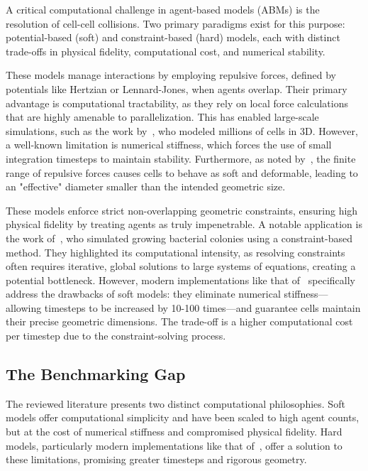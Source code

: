 \documentclass[conference]{IEEEtran}
\begin{document}
A critical computational challenge in agent-based models (ABMs) is the resolution of cell-cell collisions. Two primary paradigms exist for this purpose: potential-based (soft) and constraint-based (hard) models, each with distinct trade-offs in physical fidelity, computational cost, and numerical stability.

\begin{description}[style=nextline]
    \item[Potential-Based (Soft) Collision Models]
        These models manage interactions by employing repulsive forces, defined by potentials like Hertzian or Lennard-Jones, when agents overlap. Their primary advantage is computational tractability, as they rely on local force calculations that are highly amenable to parallelization. This has enabled large-scale simulations, such as the work by~\cite{Warren2019}, who modeled millions of cells in 3D. However, a well-known limitation is numerical stiffness, which forces the use of small integration timesteps to maintain stability. Furthermore, as noted by~\cite{Yan2019}, the finite range of repulsive forces causes cells to behave as soft and deformable, leading to an "effective" diameter smaller than the intended geometric size.

    \item[Constraint-Based (Hard) Collision Models]
        These models enforce strict non-overlapping geometric constraints, ensuring high physical fidelity by treating agents as truly impenetrable. A notable application is the work of~\cite{Rudge2012}, who simulated growing bacterial colonies using a constraint-based method. They highlighted its computational intensity, as resolving constraints often requires iterative, global solutions to large systems of equations, creating a potential bottleneck. However, modern implementations like that of~\cite{Yan2019} specifically address the drawbacks of soft models: they eliminate numerical stiffness—allowing timesteps to be increased by 10-100 times—and guarantee cells maintain their precise geometric dimensions. The trade-off is a higher computational cost per timestep due to the constraint-solving process.
\end{description}

\subsection{The Benchmarking Gap}

The reviewed literature presents two distinct computational philosophies. Soft models offer computational simplicity and have been scaled to high agent counts, but at the cost of numerical stiffness and compromised physical fidelity. Hard models, particularly modern implementations like that of~\cite{Yan2019}, offer a solution to these limitations, promising greater timesteps and rigorous geometry.
\end{document}
